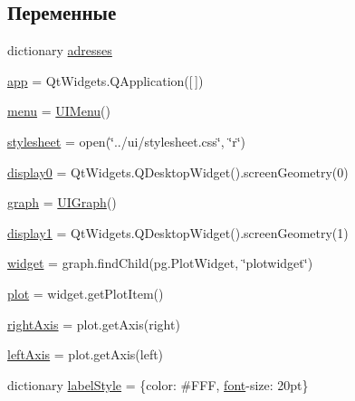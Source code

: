 \subsection*{Переменные}
\begin{DoxyCompactItemize}
\item 
dictionary \hyperlink{namespacenetwork__monitor_a58f207986e588fcaab74394ee1cf1bcb}{adresses}
\item 
\hyperlink{namespacenetwork__monitor_adbe4adbd468aaae0ca471744f30fa1f6}{app} = Qt\+Widgets.\+Q\+Application(\mbox{[}$\,$\mbox{]})
\item 
\hyperlink{namespacenetwork__monitor_ab8b736e67d7a9e580ef5b8ee4fe938f3}{menu} = \hyperlink{classnetwork__monitor_1_1_u_i_menu}{U\+I\+Menu}()
\item 
\hyperlink{namespacenetwork__monitor_aecaa32d63f4a4b3e0716b8fd40b8fb18}{stylesheet} = open(\char`\"{}../ui/stylesheet.\+css\char`\"{}, \char`\"{}r\char`\"{})
\item 
\hyperlink{namespacenetwork__monitor_aab66b1b4dd31ec48a9682731a2c7bff0}{display0} = Qt\+Widgets.\+Q\+Desktop\+Widget().screen\+Geometry(0)
\item 
\hyperlink{namespacenetwork__monitor_a699d5e9a412cebae671b9cd40b722391}{graph} = \hyperlink{classnetwork__monitor_1_1_u_i_graph}{U\+I\+Graph}()
\item 
\hyperlink{namespacenetwork__monitor_a37cbe75c4a7a0a69b30c0137312e181d}{display1} = Qt\+Widgets.\+Q\+Desktop\+Widget().screen\+Geometry(1)
\item 
\hyperlink{namespacenetwork__monitor_af816a5bcf89d9423a24881c39b602f90}{widget} = graph.\+find\+Child(pg.\+Plot\+Widget, \char`\"{}plotwidget\char`\"{})
\item 
\hyperlink{namespacenetwork__monitor_a26e25ec561afa4ed83eebb64d67c1b14}{plot} = widget.\+get\+Plot\+Item()
\item 
\hyperlink{namespacenetwork__monitor_a335a52bfad31ee0a6d975d8cb9e6db82}{right\+Axis} = plot.\+get\+Axis(\textquotesingle{}right\textquotesingle{})
\item 
\hyperlink{namespacenetwork__monitor_ad712067b9115dc6d60b0ad48899312d0}{left\+Axis} = plot.\+get\+Axis(\textquotesingle{}left\textquotesingle{})
\item 
dictionary \hyperlink{namespacenetwork__monitor_a7a1dfe61bcb6dea8bb5e51d87cfa6674}{label\+Style} = \{\textquotesingle{}color\textquotesingle{}\+: \textquotesingle{}\#F\+FF\textquotesingle{}, \textquotesingle{}\hyperlink{namespacenetwork__monitor_a3a49c4c8811caddc06b48cb72517bf6a}{font}-\/size\textquotesingle{}\+: \textquotesingle{}20pt\textquotesingle{}\}

\end{DoxyCompactItemize}
